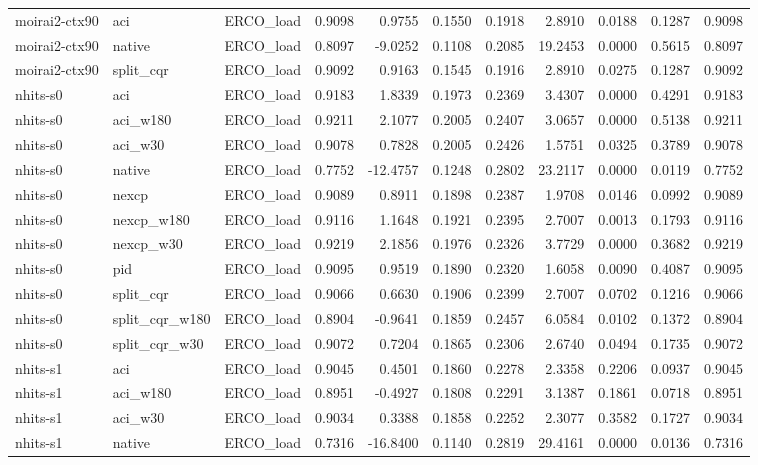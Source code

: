 \begin{tabular}{lllrrrrrrrr}
moirai2-ctx90 & aci & ERCO_load & 0.9098 & 0.9755 & 0.1550 & 0.1918 & 2.8910 & 0.0188 & 0.1287 & 0.9098 \\
moirai2-ctx90 & native & ERCO_load & 0.8097 & -9.0252 & 0.1108 & 0.2085 & 19.2453 & 0.0000 & 0.5615 & 0.8097 \\
moirai2-ctx90 & split_cqr & ERCO_load & 0.9092 & 0.9163 & 0.1545 & 0.1916 & 2.8910 & 0.0275 & 0.1287 & 0.9092 \\
nhits-s0 & aci & ERCO_load & 0.9183 & 1.8339 & 0.1973 & 0.2369 & 3.4307 & 0.0000 & 0.4291 & 0.9183 \\
nhits-s0 & aci_w180 & ERCO_load & 0.9211 & 2.1077 & 0.2005 & 0.2407 & 3.0657 & 0.0000 & 0.5138 & 0.9211 \\
nhits-s0 & aci_w30 & ERCO_load & 0.9078 & 0.7828 & 0.2005 & 0.2426 & 1.5751 & 0.0325 & 0.3789 & 0.9078 \\
nhits-s0 & native & ERCO_load & 0.7752 & -12.4757 & 0.1248 & 0.2802 & 23.2117 & 0.0000 & 0.0119 & 0.7752 \\
nhits-s0 & nexcp & ERCO_load & 0.9089 & 0.8911 & 0.1898 & 0.2387 & 1.9708 & 0.0146 & 0.0992 & 0.9089 \\
nhits-s0 & nexcp_w180 & ERCO_load & 0.9116 & 1.1648 & 0.1921 & 0.2395 & 2.7007 & 0.0013 & 0.1793 & 0.9116 \\
nhits-s0 & nexcp_w30 & ERCO_load & 0.9219 & 2.1856 & 0.1976 & 0.2326 & 3.7729 & 0.0000 & 0.3682 & 0.9219 \\
nhits-s0 & pid & ERCO_load & 0.9095 & 0.9519 & 0.1890 & 0.2320 & 1.6058 & 0.0090 & 0.4087 & 0.9095 \\
nhits-s0 & split_cqr & ERCO_load & 0.9066 & 0.6630 & 0.1906 & 0.2399 & 2.7007 & 0.0702 & 0.1216 & 0.9066 \\
nhits-s0 & split_cqr_w180 & ERCO_load & 0.8904 & -0.9641 & 0.1859 & 0.2457 & 6.0584 & 0.0102 & 0.1372 & 0.8904 \\
nhits-s0 & split_cqr_w30 & ERCO_load & 0.9072 & 0.7204 & 0.1865 & 0.2306 & 2.6740 & 0.0494 & 0.1735 & 0.9072 \\
nhits-s1 & aci & ERCO_load & 0.9045 & 0.4501 & 0.1860 & 0.2278 & 2.3358 & 0.2206 & 0.0937 & 0.9045 \\
nhits-s1 & aci_w180 & ERCO_load & 0.8951 & -0.4927 & 0.1808 & 0.2291 & 3.1387 & 0.1861 & 0.0718 & 0.8951 \\
nhits-s1 & aci_w30 & ERCO_load & 0.9034 & 0.3388 & 0.1858 & 0.2252 & 2.3077 & 0.3582 & 0.1727 & 0.9034 \\
nhits-s1 & native & ERCO_load & 0.7316 & -16.8400 & 0.1140 & 0.2819 & 29.4161 & 0.0000 & 0.0136 & 0.7316 \\

\end{tabular}

